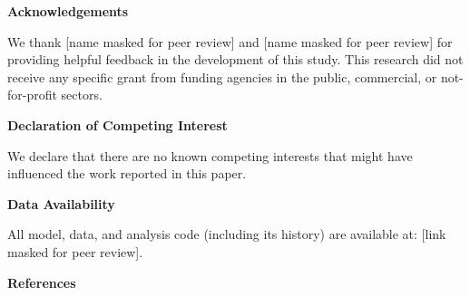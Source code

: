 \documentclass[
  12pt,
]{article}
\begin{document}
\vspace{5mm}

\textbf{Acknowledgements}

We thank {[}name masked for peer review{]} and {[}name masked for peer
review{]} for providing helpful feedback in the development of this
study. This research did not receive any specific grant from funding
agencies in the public, commercial, or not-for-profit sectors.

\vspace{5mm}

\textbf{Declaration of Competing Interest}

We declare that there are no known competing interests that might have
influenced the work reported in this paper.

\vspace{5mm}

\textbf{Data Availability}

All model, data, and analysis code (including its history) are available
at: {[}link masked for peer review{]}.

\newpage

\textbf{References}
\end{document}
